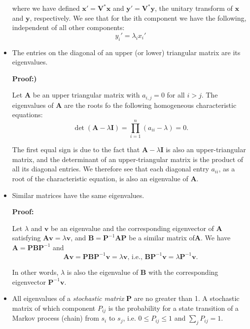 \documentclass[10pt,b5paper,titlepage]{book}
\begin{document}
\begin{itemize}
where we have defined $\mathbf{x}' = \mathbf{V}^{*} \mathbf{x}$ and $\mathbf{y}' = \mathbf{V}^{*} \mathbf{y}$, the unitary transform of $\mathbf{x}$ and $\mathbf{y}$, respectively. We see that for the ith component we have the following, independent of all other components:
\begin{equation}
y_{i}' = \lambda_{i} x_{i}'
\end{equation}

\item The entries on the diagonal of an upper (or lower) triangular matrix are its eigenvalues.

\textbf{Proof:)}

Let $\mathbf{A}$ be an upper triangular matrix with $a_{i,j} = 0$ for all $i > j$. The eigenvalues of $\mathbf{A}$ are the roots fo the following homogeneous characteristic equations:
\begin{equation}
\det{(\mathbf{A} - \lambda \mathbf{I})} = \prod_{i=1}^{n}{(a_{ii} - \lambda)} = 0
.\end{equation}

The first equal sign is due to the fact that $\mathbf{A} - \lambda \mathbf{I}$ is also an upper-triangular matrix, and the determinant of an upper-triangular matrix is the product of all its diagonal entries. We therefore see that each diagonal entry $a_{ii}$, as a root of the characteristic equation, is also an eigenvalue of $\mathbf{A}$.

\item Similar matrices have the same eigenvalues.

\textbf{Proof:}

Let $\lambda$ and $\mathbf{v}$ be an eigenvalue and the corresponding eigenvector of $\mathbf{A}$ satisfying $\mathbf{A} \mathbf{v} = \lambda \mathbf{v}$, and $\mathbf{B} = \mathbf{P}^{-1} \mathbf{A} \mathbf{P}$ be a similar matrix of$\mathbf{A}$. We have $\mathbf{A} = \mathbf{P} \mathbf{B} \mathbf{P}^{-1}$ and
\begin{equation}
\mathbf{A} \mathbf{v} = \mathbf{P} \mathbf{B} \mathbf{P}^{-1} \mathbf{v} = \lambda \mathbf{v}
\text{, i.e., }
\mathbf{B} \mathbf{P}^{-1} \mathbf{v} = \lambda \mathbf{P}^{-1} \mathbf{v}
.\end{equation}

In other words, $\lambda$ is also the eigenvalue of $\mathbf{B}$ with the corresponding eigenvector $\mathbf{P}^{-1} \mathbf{v}$.

\item All eigenvalues of a \textit{stochastic matrix} $\mathbf{P}$ are no greater than 1. A stochastic matrix of which component $P_{ij}$ is the probability for a state transition of a Markov process (chain) from $s_{i}$ to $s_{j}$, i.e. $0 \leq P_{ij} \leq 1$ and $\sum_{j}P_{ij} = 1$.


\end{itemize}
\end{document}
